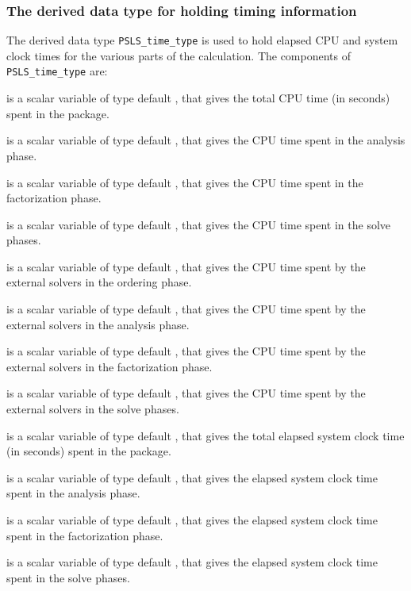 \documentclass{galahad}
\newcommand{\packagename}{PSLS}
\begin{document}
\subsubsection{The derived data type for holding timing
 information}\label{typetime}
The derived data type
{\tt \packagename\_time\_type}
is used to hold elapsed CPU and system clock times for the various parts
of the calculation. The components of
{\tt \packagename\_time\_type}
are:
\begin{description}
 is a scalar variable of type default \realdp, that gives
 the total CPU time (in seconds) spent in the package.

 is a scalar variable of type default \realdp, that gives
 the CPU time spent in the analysis phase.

 is a scalar variable of type default \realdp, that gives
 the CPU time spent in the factorization phase.

 is a scalar variable of type default \realdp, that gives
 the CPU time spent in the solve phases.

 is a scalar variable of type default \realdp, that gives
 the CPU time spent by the external solvers in the ordering phase.

 is a scalar variable of type default \realdp, that gives
 the CPU time spent by the external solvers in the analysis phase.

 is a scalar variable of type default \realdp, that gives
 the CPU time spent by the external solvers in the factorization phase.

 is a scalar variable of type default \realdp, that gives
 the CPU time spent by the external solvers in the solve phases.

 is a scalar variable of type default \realdp, that gives
 the total elapsed system clock time (in seconds) spent in the package.

 is a scalar variable of type default \realdp, that gives
 the elapsed system clock time spent in the analysis phase.

 is a scalar variable of type default \realdp, that gives
 the elapsed system clock time spent in the factorization phase.

 is a scalar variable of type default \realdp, that gives
 the elapsed system clock time spent in the solve phases.


\end{description}
\end{document}
